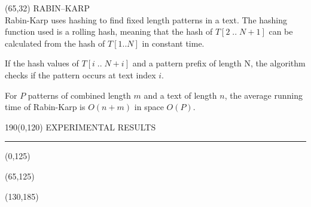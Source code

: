 \documentclass[a4paper]{article} %
\begin{document}
\begin{textblock}{60}(65,32)
  {\sffamily\normalsize{\color{sciorange}RABIN--KARP}}\vspace{1mm}\\
  \footnotesize 
      Rabin-Karp uses hashing to find fixed length patterns in a text. The hashing function used is a rolling hash, meaning that the hash of $T[2\;..\;N+1]$ can be calculated from the hash of $T[1..N]$ in constant time. 
     
If the hash values of $T[i\;..\;N+i]$ and a pattern prefix of length N, the algorithm checks if the pattern occurs at text index $i$.

    For $P$ patterns of combined length $m$  and a text of length $n$, the average running time of Rabin-Karp is $O(n+m)$ in space $O(P)$.
\end{textblock}



\begin{textblock}{190}(0,120)
\sffamily
\Large{\color{sciorange}EXPERIMENTAL RESULTS}\small\\
\rule[3mm]{190mm}{0.1pt}
\end{textblock} 


\begin{textblock}{60}(0,125) 
\end{textblock}

\begin{textblock}{60}(65,125) 
\end{textblock} 



\begin{textblock}{60}(130,185)
  \def\refname{\normalfont\sffamily\normalsize{\color{sciorange}REFERENCES}}
  \scriptsize\sffamily
  
  
\end{textblock}

\end{document}
